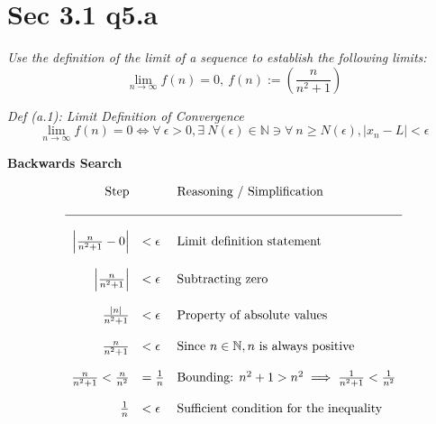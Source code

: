 \documentclass[11pt]{article}
\newcommand{\question}[1]{
    \begin{mdframed}[
        linecolor=gray,       %
        linewidth=0.5pt,      %
        innertopmargin=10pt,  %
        innerbottommargin=10pt %
    ]
    \centering \itshape #1
    \end{mdframed}
}
\newcommand{\subp}[1]{
    \begin{mdframed}[
        linewidth=0.5pt,      %
        innertopmargin=10pt,  %
        innerbottommargin=10pt %
    ]
    \centering \itshape #1
    \end{mdframed}
}
\theoremstyle{plain}
\begin{document}
\begin{minipage}{\textwidth}
	\section*{ Sec 3.1 q5.a}
	\question{
		Use the definition of the limit of a sequence to establish the following limits:
		\[ \lim_{n \to \infty} f(n)=0, ~f(n):=(\frac{n}{n^2+1}) \]
	}
	\vspace{1em}
	\subp{
		Def (a.1): Limit Definition of Convergence
		\[ \lim_{n \to \infty} f(n)=0 \iff \forall ~\epsilon>0, \exists ~N(\epsilon) \in \mathbb{N} \ni \forall ~n \geq  N(\epsilon), |x_n - L| < \epsilon \]
	} \vspace{1em}

	\begin{center} \textbf{Backwards Search} \end{center}
	\vspace{1em}
	\[
		\begin{array}{rll}
			\text{Step}                        &                      & \text{Reasoning / Simplification}                                      \\ \\
			\hline                                                                                                                             \\
			\left| \frac{n}{n^2+1} - 0 \right| & < \epsilon           & \text{Limit definition statement}                                      \\ \\
			\left| \frac{n}{n^2+1} \right|     & < \epsilon           & \text{Subtracting zero}                                                \\ \\
			\frac{|n|}{n^2+1}                  & < \epsilon           & \text{Property of absolute values}                                     \\ \\
			\frac{n}{n^2+1}                    & < \epsilon           & \text{Since } n \in \mathbb{N}, n \text{ is always positive}           \\ \\
			\frac{n}{n^2+1} < \frac{n}{n^2}    & = \frac{1}{n}        & \text{Bounding: } n^2+1 > n^2 \implies \frac{1}{n^2+1} < \frac{1}{n^2} \\ \\
			\frac{1}{n}                        & < \epsilon           & \text{Sufficient condition for the inequality}                         \\ \\

\end{array}\]
\end{minipage}
\end{document}
